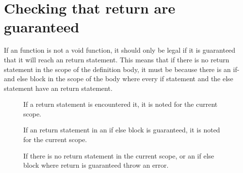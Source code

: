 \section{Checking that return are guaranteed}
If an function is not a void function, it should only be legal if it is guaranteed that it will reach an return statement. This means that if there is no return statement in the scope of the definition body, it must be because there is an if- and else block in the scope of the body where every if statement and the else statement have an return statement. 

\begin{figure}[H]
\centering
{}
\caption{If a return statement is encountered it, it is noted for the current scope.}
\label{lf05}
\end{figure}

\begin{figure}[H]
\centering
{}
\caption{If an return statement in an if else block is guaranteed, it is noted for the current scope.} 
\label{lf05}
\end{figure}

 \begin{figure}[H]
\centering
{}
\caption{If there is no return statement in the current scope, or an if else block where return is guaranteed throw an error.}
\label{lf05}
\end{figure}


